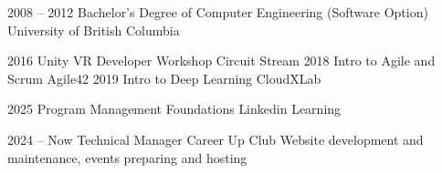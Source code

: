 \documentclass[9pt]{developercv} %
\begin{document}


\begin{entrylist}
	\entry
		{2008 -- 2012}
		{Bachelor's Degree of Computer Engineering (Software Option)}
		{University of British Columbia}
		{}
\end{entrylist}


\begin{entrylist}
  \entry
    {2016}
    {Unity VR Developer Workshop}
    {Circuit Stream}
    {}
  \entry
    {2018}
    {Intro to Agile and Scrum}
    {Agile42}
    {}
  \entry
    {2019}
    {Intro to Deep Learning}
    {CloudXLab}
    {}
\end{entrylist}
\begin{entrylist}
	\entry
		{2025}
		{Program Management Foundations}
		{Linkedin Learning}
		{}
\end{entrylist}


\begin{entrylist}
	\entry
		{2024 -- Now}
		{Technical Manager}
		{Career Up Club}
		{Website development and maintenance, events preparing and hosting}
\end{entrylist}
\end{document}
